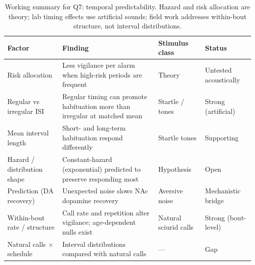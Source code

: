 \begin{table}[tbp]
\centering
\footnotesize
\singlespacing
\caption{Working summary for Q7: temporal predictability. Hazard and risk allocation are theory; lab timing effects use artificial sounds; field work addresses within-bout structure, not interval distributions.}
\label{tab:summary-q7}
\begin{tabular}{@{}p{1.35in}p{2.55in}p{1.2in}p{0.9in}@{}}
\toprule
\textbf{Factor} & \textbf{Finding} & \textbf{Stimulus class} & \textbf{Status} \\
\midrule
Risk allocation & Less vigilance per alarm when high-risk periods are frequent & Theory & Untested acoustically \\
\addlinespace[2pt]
Regular vs irregular ISI & Regular timing can promote habituation more than irregular at matched mean & Startle / tones & Strong (artificial) \\
\addlinespace[2pt]
Mean interval length & Short- and long-term habituation respond differently & Startle tones & Supporting \\
\addlinespace[2pt]
Hazard / distribution shape & Constant-hazard (exponential) predicted to preserve responding most & Hypothesis & Open \\
\addlinespace[2pt]
Prediction (DA recovery) & Unexpected noise slows NAc dopamine recovery & Aversive noise & Mechanistic bridge \\
\addlinespace[2pt]
Within-bout rate / structure & Call rate and repetition alter vigilance; age-dependent nulls exist & Natural sciurid calls & Strong (bout-level) \\
\addlinespace[2pt]
Natural calls $\times$ schedule & Interval distributions compared with natural calls & --- & Gap \\
\bottomrule
\end{tabular}
\end{table}

